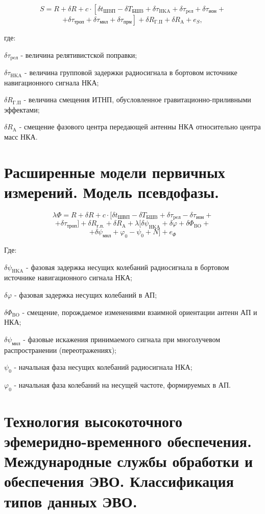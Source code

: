 \documentclass[14pt,a4paper,oneside]{extarticle}
\begin{document}
\[S=R+\delta R+c\cdot\left[\delta t_{\text{ШBП}}-\delta T_{\text{БШB}}+\delta\tau_{\text{HKA}}+\delta\tau_{\text{peл}}+\delta\tau_{\text{ион}}\right.+\]
        \[\left.+\delta\tau_{\text{троп}}+\delta\tau_{\text{мнл}}+\delta\tau_{\text{прм}}\right]+\delta R_{\mathrm{\Gamma.\Pi}}+\delta R_{\mathrm{A}}+e_{S},\]

где:

$\delta\tau_{\text{peл}}$ - величина релятивистской поправки;

$\delta\tau_{\text{HKA}}$ - величина групповой задержки радиосигнала в бортовом источнике навигационного сигнала НКА;

$\delta R_{\mathrm{\Gamma.\Pi}}$ - величина смещения ИТНП, обусловленное гравитационно-приливными эффектами;

$\delta R_{\mathrm{A}}$ - смещение фазового центра передающей антенны НКА относительно центра масс НКА.



\section{Расширенные модели первичных измерений. Модель псевдофазы.}

\[\lambda\Phi=R+\delta R+c\cdot[\delta t_{\text{ШВП}}-\delta T_{\text{БШB}}+\delta\tau_{\text{peл}}-\delta\tau_{\text{ион}}+\]
        \[+\delta\tau_{\text{троп}}]+\delta R_{\text{г.п.}}+\delta R_{\text{A}}+\lambda[\delta\psi_{\text{HKA}}+\delta\varphi+\delta\Phi_{\text{BO}}+\]
        \[+\delta\psi_{\text{мнл}}+\varphi_{0}-\psi_{0}+N]+e_{\Phi}\]

Где:

$\delta\psi_{\text{HKA}}$ - фазовая задержка несущих колебаний радиосигнала в бортовом источнике навигационного сигнала НКА;

$\delta\varphi$ - фазовая задержка несущих колебаний в АП;

$\delta\Phi_{\text{BO}}$ - смещение, порождаемое изменениями взаимной ориентации антенн АП и НКА;

$\delta\psi_{\text{мнл}}$ - фазовые искажения принимаемого сигнала при многолучевом распространении (переотражениях);

$\psi_{0}$ - начальная фаза несущих колебаний радиосигнала НКА;

$\varphi_{0}$ - начальная фаза колебаний на несущей частоте, формируемых в АП.

\section{Технология высокоточного эфемеридно-временного обеспечения. Международные службы обработки и обеспечения ЭВО. Классификация типов данных ЭВО.}
\end{document}

